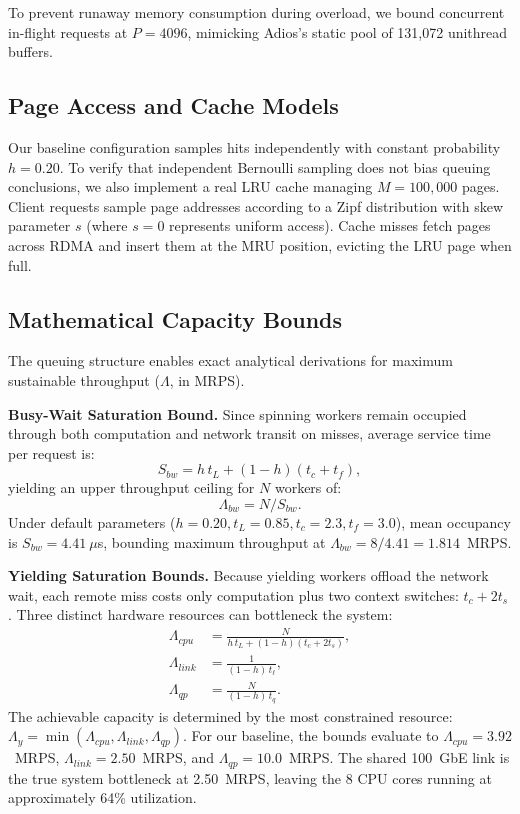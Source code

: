 To prevent runaway memory consumption during overload, we bound concurrent in-flight requests at $P = 4096$, mimicking Adios's static pool of 131,072 unithread buffers.

\subsection{Page Access and Cache Models}
Our baseline configuration samples hits independently with constant probability $h = 0.20$. To verify that independent Bernoulli sampling does not bias queuing conclusions, we also implement a real LRU cache managing $M = 100{,}000$ pages. Client requests sample page addresses according to a Zipf distribution with skew parameter $s$ (where $s=0$ represents uniform access). Cache misses fetch pages across RDMA and insert them at the MRU position, evicting the LRU page when full.

\subsection{Mathematical Capacity Bounds}
\label{sec:bounds}
The queuing structure enables exact analytical derivations for maximum sustainable throughput ($\Lambda$, in MRPS).

\textbf{Busy-Wait Saturation Bound.} Since spinning workers remain occupied through both computation and network transit on misses, average service time per request is:
\begin{equation}
S_{bw}=h\,t_L+(1-h)(t_c+t_f),
\label{eq:sbw}
\end{equation}
yielding an upper throughput ceiling for $N$ workers of:
\begin{equation}
\Lambda_{bw}=N/S_{bw}.
\label{eq:lbw}
\end{equation}
Under default parameters ($h=0.20, t_L=0.85, t_c=2.3, t_f=3.0$), mean occupancy is $S_{bw} = 4.41~\mu$s, bounding maximum throughput at $\Lambda_{bw} = 8 / 4.41 = 1.814$~MRPS.

\textbf{Yielding Saturation Bounds.} Because yielding workers offload the network wait, each remote miss costs only computation plus two context switches: $t_c + 2t_s$. Three distinct hardware resources can bottleneck the system:
\begin{align}
\Lambda_{cpu}&=\frac{N}{h\,t_L+(1-h)(t_c+2t_s)},\label{eq:lcpu}\\
\Lambda_{link}&=\frac{1}{(1-h)\,t_\ell},\label{eq:llink}\\
\Lambda_{qp}&=\frac{N}{(1-h)\,t_q}.\label{eq:lqp}
\end{align}
The achievable capacity is determined by the most constrained resource: $\Lambda_y = \min(\Lambda_{cpu}, \Lambda_{link}, \Lambda_{qp})$. For our baseline, the bounds evaluate to $\Lambda_{cpu} = 3.92$~MRPS, $\Lambda_{link} = 2.50$~MRPS, and $\Lambda_{qp} = 10.0$~MRPS. The shared 100~GbE link is the true system bottleneck at 2.50~MRPS, leaving the 8 CPU cores running at approximately 64\% utilization.

